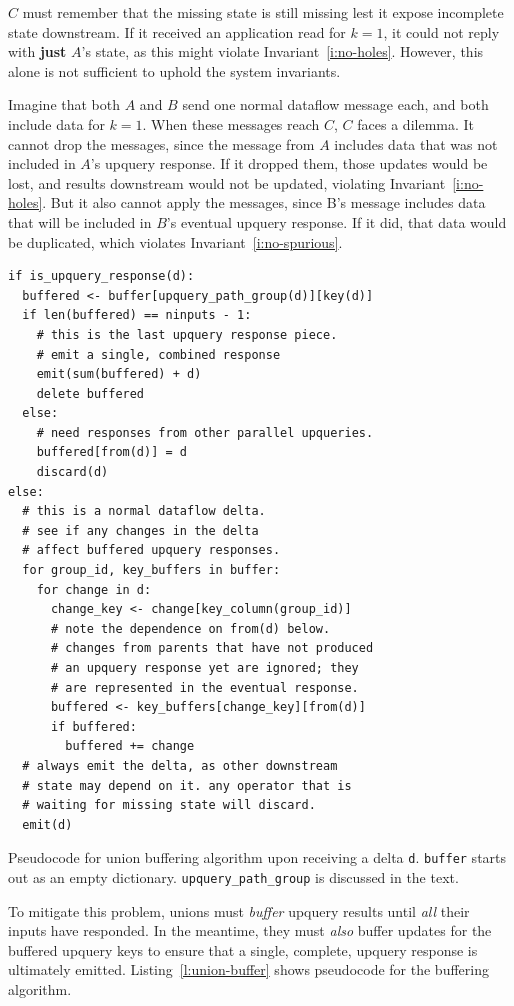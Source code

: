 $C$ must remember that the missing state is still missing lest it expose
incomplete state downstream. If it received an application read for $k = 1$, it
could not reply with \textbf{just} $A$'s state, as this might violate
Invariant~\ref{i:no-holes}. However, this alone is not sufficient to uphold the
system invariants.

Imagine that both $A$ and $B$ send one normal dataflow message each, and both
include data for $k = 1$. When these messages reach $C$, $C$ faces a dilemma. It
cannot drop the messages, since the message from $A$ includes data that was not
included in $A$'s upquery response. If it dropped them, those updates would be
lost, and results downstream would not be updated, violating
Invariant~\ref{i:no-holes}. But it also cannot apply the messages, since B's
message includes data that will be included in $B$'s eventual upquery response.
If it did, that data would be duplicated, which violates
Invariant~\ref{i:no-spurious}.

\begin{listing}
  \begin{verbatim}
if is_upquery_response(d):
  buffered <- buffer[upquery_path_group(d)][key(d)]
  if len(buffered) == ninputs - 1:
    # this is the last upquery response piece.
    # emit a single, combined response
    emit(sum(buffered) + d)
    delete buffered
  else:
    # need responses from other parallel upqueries.
    buffered[from(d)] = d
    discard(d)
else:
  # this is a normal dataflow delta.
  # see if any changes in the delta
  # affect buffered upquery responses.
  for group_id, key_buffers in buffer:
    for change in d:
      change_key <- change[key_column(group_id)]
      # note the dependence on from(d) below.
      # changes from parents that have not produced
      # an upquery response yet are ignored; they
      # are represented in the eventual response.
      buffered <- key_buffers[change_key][from(d)]
      if buffered:
        buffered += change
  # always emit the delta, as other downstream
  # state may depend on it. any operator that is
  # waiting for missing state will discard.
  emit(d)
  \end{verbatim}
  \caption{Pseudocode for union buffering algorithm upon receiving a delta
  \texttt{d}. \texttt{buffer} starts out as an empty dictionary.
  \texttt{upquery\_path\_group} is discussed in the text.}
  \label{l:union-buffer}
\end{listing}

To mitigate this problem, unions must \textit{buffer} upquery results until
\emph{all} their inputs have responded. In the meantime, they must \emph{also}
buffer updates for the buffered upquery keys to ensure that a single, complete,
upquery response is ultimately emitted. Listing~\vref{l:union-buffer} shows
pseudocode for the buffering algorithm.

